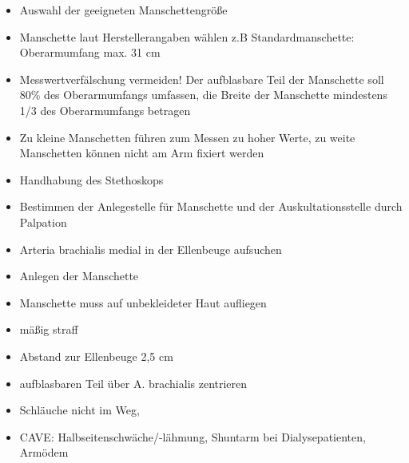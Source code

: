\documentclass{article}
\begin{document}
\begin{itemize}
\item {\mdseries
Auswahl der geeigneten Manschettengr\"o{\ss}e}

\end{itemize}
\begin{itemize}
\item {\mdseries
Manschette laut Herstellerangaben w\"ahlen z.B Standardmanschette:
Oberarmumfang max. 31 cm}

\item {\mdseries
Messwertverf\"alschung vermeiden! Der aufblasbare Teil der Manschette
soll 80\% des Oberarmumfangs umfassen, die Breite der Manschette
mindestens 1/3 des Oberarmumfangs betragen}

\item {\mdseries
Zu kleine Manschetten f\"uhren zum Messen zu hoher Werte, zu weite
Manschetten k\"onnen nicht am Arm fixiert werden}

\end{itemize}
\begin{itemize}
\item {\mdseries
Handhabung des Stethoskops}

\item {\mdseries
Bestimmen der Anlegestelle f\"ur Manschette und der Auskultationsstelle
durch Palpation}

\end{itemize}
\begin{itemize}
\item {\mdseries
Arteria brachialis medial in der Ellenbeuge aufsuchen}

\end{itemize}
\begin{itemize}
\item {\mdseries
Anlegen der Manschette}

\end{itemize}
\begin{itemize}
\item {\mdseries
Manschette muss auf unbekleideter Haut aufliegen}

\item {\mdseries
m\"a{\ss}ig straff}

\item {\mdseries
Abstand zur Ellenbeuge 2,5 cm}

\item {\mdseries
aufblasbaren Teil \"uber A. brachialis zentrieren}

\item {\mdseries
Schl\"auche nicht im Weg,}

\item {\mdseries
CAVE: Halbseitenschw\"ache/-l\"ahmung, Shuntarm bei Dialysepatienten,
Arm\"odem}

\end{itemize}
\end{document}
